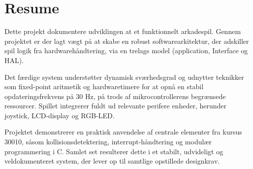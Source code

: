 \clearpage
\section*{Resume} 
\vspace{1em}

Dette projekt dokumentere udviklingen at et funktionnelt arkadespil. Gennem projektet er der lagt vægt på at skabe en robust softwarearkitektur, der adskiller spil logik fra hardwarehåndtering, via en trelags model (application, Interface og HAL).

Det færdige system understøtter dynamisk sværhedsgrad og udnytter teknikker som fixed-point aritmetik og hardwaretimere for at opnå en stabil opdateringsfrekvens på 30 Hz, på trods af mikrocontrollerens begrænsede ressourcer. Spillet integrerer fuldt ud relevante perifere enheder, herunder joystick, LCD-display og RGB-LED.

Projektet demonstrerer en praktisk anvendelse af centrale elementer fra kursus 30010, såsom kollisionsdetektering, interrupt-håndtering og modulær programmering i C. Samlet set resulterer dette i et stabilt, udvideligt og veldokumenteret system, der lever op til samtlige opstillede designkrav.


